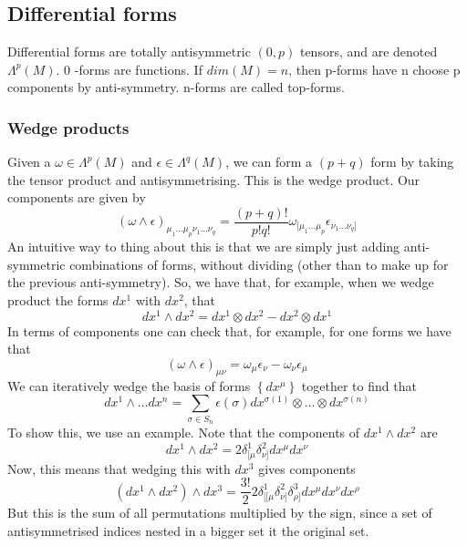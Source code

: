 \subsection{Differential forms} 
Differential forms are totally antisymmetric $ ( 0 , p )  $ tensors, and are denoted $ \Lambda^ p ( M ) $. 
0 -forms are functions. If  $ dim ( M )  = n$, then p-forms have n choose p components by anti-symmetry. 
n-forms are called top-forms. 

\subsubsection{Wedge products} 
Given a $ \omega  \in \Lambda^ p ( M ) $ and $ \epsilon \in \Lambda^ q ( M ) $, we can form a  $ ( p + q ) $ form 
by taking the tensor product and antisymmetrising. 
This is the wedge product. 
Our components are given by 
\[
( \omega \wedge  \epsilon )_{ \mu_1 \dots \mu_{ p } \nu_1 \dots \nu_{ q }} = \frac{ ( p + q ) ! }{p ! q ! } \omega _{ [ \mu_1 \dots \mu_p } \epsilon_{ \nu_1 \dots \nu_q ] }
\] An intuitive way to thing about this is that 
we are simply just adding anti-symmetric combinations of 
forms, without dividing (other than to make up for the previous 
anti-symmetry). So, we have that, for example, when 
we wedge product the forms $ dx ^ 1  $ with $dx^ 2 $, that 
\[
dx^ 1 \wedge  dx^ 2 = dx^ 1 \otimes dx^ 2 - dx^ 2 \otimes dx^ 1 
\] In terms of components one can check that, for example, for one forms we have that 
\[
( \omega \wedge  \epsilon )_{ \mu \nu } = \omega_{ \mu } \epsilon_{ \nu } - \omega_{ \nu } \epsilon_{ \mu }
\] We can iteratively wedge the basis of forms $\left\{  dx^ \mu  \right\}  $
together to find that 
\[
dx ^ 1 \wedge  \dots dx^ n = \sum_{ \sigma \in S_n } \epsilon ( \sigma)  dx^{ \sigma ( 1) } \otimes \dots \otimes dx^{ \sigma( n ) }
\] To show this, we use an example. Note that the 
components of $ dx^ 1 \wedge  dx^ 2 $ are 
\[
dx^ 1 \wedge  dx^ 2 = 2 \delta^ 1 _{ [ \mu } \delta^ 2 _{ \nu ] } dx^ \mu dx^ \nu 
\]  Now, this means that wedging this with $ dx^ 3 $ gives 
components  \[
( dx^ 1 \wedge  dx^ 2 ) \wedge  dx^ 3 = \frac{3!}{2 } 2 \delta^1_{ [ [ \mu } \delta^ 2_{ \nu ] } \delta^ 3 _{ \rho ] } dx^ \mu dx^ \nu dx^ \rho 
\] But this is the sum of all permutations multiplied 
by the sign, since a set of antisymmetrised indices nested 
in a bigger set it the original set.

